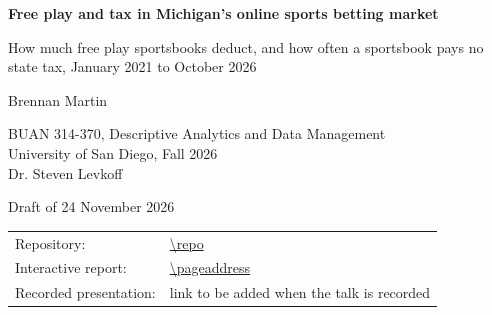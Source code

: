 \begin{titlepage}
\thispagestyle{empty}
\vspace*{2cm}
{\LARGE\bfseries Free play and tax in Michigan's online sports betting market\par}
\vspace{0.6cm}
{\large How much free play sportsbooks deduct, and how often a sportsbook pays no state tax, January 2021 to October 2026\par}
\vspace{1.4cm}
{\large Brennan Martin\par}
\vspace{0.3cm}
BUAN 314-370, Descriptive Analytics and Data Management\\
University of San Diego, Fall 2026\\
Dr. Steven Levkoff\par
\vspace{0.3cm}
Draft of 24 November 2026\par
\vspace{1.4cm}
\begin{tabular}{@{}ll@{}}
Repository: & \url{\repo} \\
Interactive report: & \url{\pageaddress} \\
Recorded presentation: & link to be added when the talk is recorded \\
\end{tabular}
\ifdraft
\vfill
{}
\fi
\end{titlepage}
